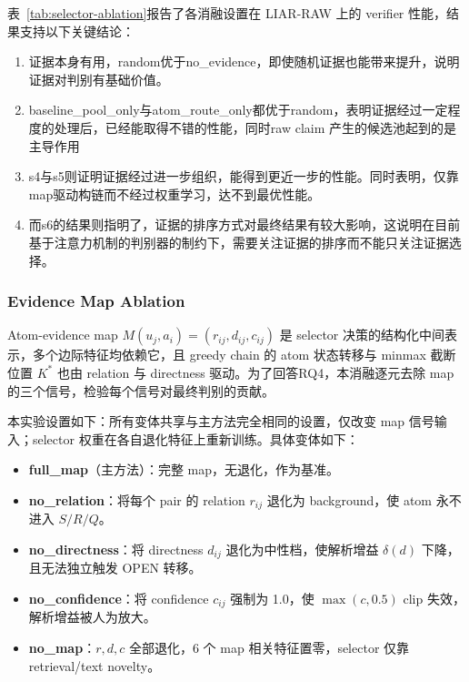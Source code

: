 \documentclass[letterpaper]{article}
\begin{document}
表~\ref{tab:selector-ablation}报告了各消融设置在 LIAR-RAW 上的 verifier 性能，结果支持以下关键结论：

\begin{enumerate}
\item 证据本身有用，random优于no\_evidence，即使随机证据也能带来提升，说明证据对判别有基础价值。
\item baseline\_pool\_only与atom\_route\_only都优于random，表明证据经过一定程度的处理后，已经能取得不错的性能，同时raw claim 产生的候选池起到的是主导作用
\item s4与s5则证明证据经过进一步组织，能得到更近一步的性能。同时表明，仅靠map驱动构链而不经过权重学习，达不到最优性能。
\item 而s6的结果则指明了，证据的排序方式对最终结果有较大影响，这说明在目前基于注意力机制的判别器的制约下，需要关注证据的排序而不能只关注证据选择。
\end{enumerate}

\subsubsection{Evidence Map Ablation}

Atom-evidence map $M(u_j,a_i)=(r_{ij},d_{ij},c_{ij})$ 是 selector 决策的结构化中间表示，多个边际特征均依赖它，且 greedy chain 的 atom 状态转移与 minmax 截断位置 $K^\ast$ 也由 relation 与 directness 驱动。为了回答RQ4，本消融逐元去除 map 的三个信号，检验每个信号对最终判别的贡献。

本实验设置如下：所有变体共享与主方法完全相同的设置，仅改变 map 信号输入；selector 权重在各自退化特征上重新训练。具体变体如下：

\begin{itemize}
\item \textbf{full\_map}（主方法）：完整 map，无退化，作为基准。
\item \textbf{no\_relation}：将每个 pair 的 relation $r_{ij}$ 退化为 background，使 atom 永不进入 $S/R/Q$。
\item \textbf{no\_directness}：将 directness $d_{ij}$ 退化为中性档，使解析增益 $\delta(d)$ 下降，且无法独立触发 OPEN 转移。
\item \textbf{no\_confidence}：将 confidence $c_{ij}$ 强制为 1.0，使 $\max(c,0.5)$ clip 失效，解析增益被人为放大。
\item \textbf{no\_map}：$r,d,c$ 全部退化，6 个 map 相关特征置零，selector 仅靠 retrieval/text novelty。
\end{itemize}
\end{document}
